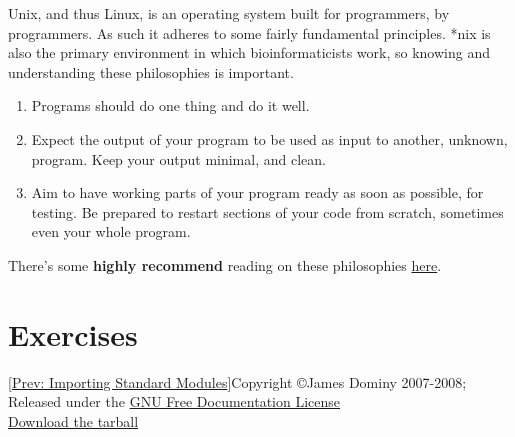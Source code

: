 \documentclass[a4paper,11pt]{article}
\begin{document}
Unix, and thus Linux, is an operating system built for programmers,   by programmers. As such it adheres to some fairly fundamental   principles. *nix is also the primary environment in which   bioinformaticists work, so knowing and understanding these philosophies   is important.
\begin{enumerate}
	\item Programs should do one thing and do it well.
	\item Expect the output of your program to be used as input to    another, unknown, program. Keep your output minimal, and    clean.
	\item Aim to have working parts of your program ready as soon as    possible, for testing. Be prepared to restart sections of your code    from scratch, sometimes even your whole program.
\end{enumerate}

There's some \textbf{highly recommend} reading on these   philosophies \href{http://www.faqs.org/docs/artu/ch01s06.html}{here}.

\section{Exercises}    [\href{importing_modules.html}{Prev: Importing Standard Modules}]      Copyright \copyright James Dominy 2007-2008; Released under the \href{http://www.gnu.org/copyleft/fdl.html}{GNU Free Documentation License}
\\\href{intropython.tar.gz}{Download the tarball}
\end{document}

